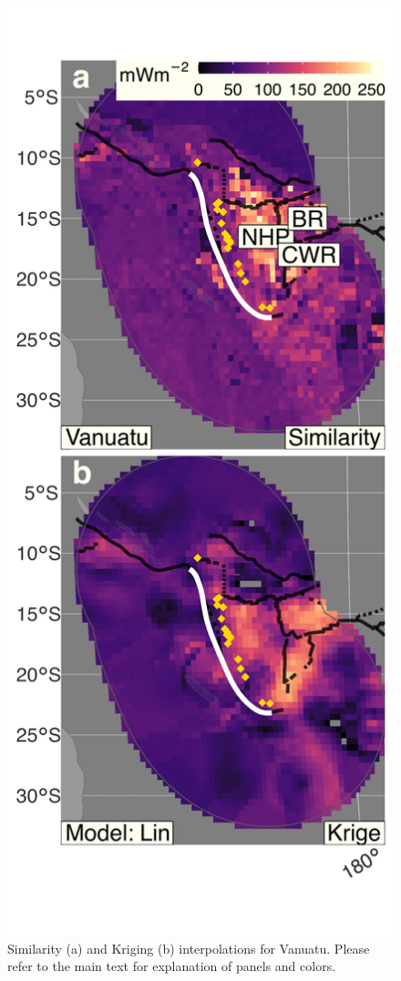 \begin{figure}[htbp]

{\centering \includegraphics[width=1\linewidth,]{assets/figs/chpt3/VanuatuDiffComp} 

}

\caption[Similarityand Kriging interpolations for Vanuatu]{Similarity (a) and Kriging (b) interpolations for Vanuatu. Please refer to the main text for explanation of panels and colors.}\label{fig:vanuatuDiff}
\end{figure}

